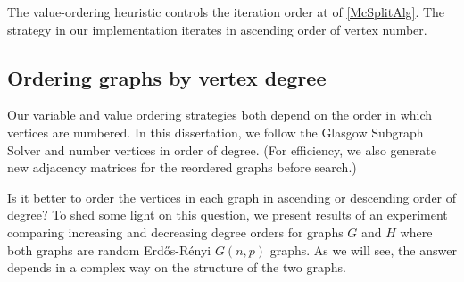 The value-ordering heuristic controls the iteration
order at  of \cref{McSplitAlg}. The strategy
in our implementation iterates in ascending order of vertex number.

\subsection{Ordering graphs by vertex degree}

Our variable and value ordering strategies both depend on the order
in which vertices are numbered.
In this dissertation, we follow the Glasgow Subgraph Solver
\citep{DBLP:journals/jair/McCreeshPST18,DBLP:conf/gg/McCreeshP020}
and number vertices in order of degree. (For efficiency, we
also generate new adjacency matrices for the reordered graphs
before search.)

Is it better to order the vertices in each graph in ascending or descending
order of degree?  To shed some light on this question, we present results of an
experiment comparing increasing and decreasing degree orders for graphs
$G$ and $H$ where both graphs are random Erd\H{o}s-Rényi $G(n,p)$ graphs.  As
we will see, the answer depends in a complex way on the structure of the two
graphs.

